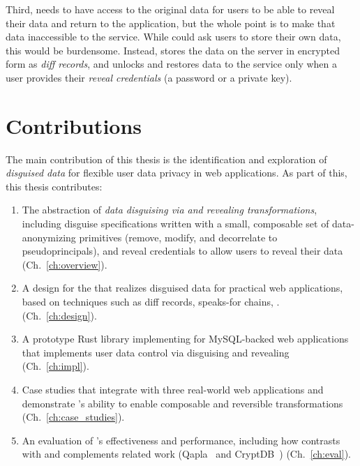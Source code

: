 %
Third, \sys needs to have access to the original data for users to be able to
reveal their data and return to the application, but the whole point is to make
that data inaccessible to the service.
%
While \sys could ask users to store their own \xxed data, this would be
burdensome.
%
Instead, \sys stores the \xxed data on the server in encrypted form as
\emph{diff records}, and unlocks
and restores data to the service only when a user provides their \emph{reveal
credentials} (\eg a password or a private key).

%
\section{Contributions}
%
The main contribution of this thesis is the identification and exploration of
\emph{disguised data} for flexible user data privacy in web applications. As
part of this, this thesis contributes:

\begin{enumerate}[nosep]
    \item The abstraction of \emph{data disguising via \xxing and revealing
        transformations}, including 
        disguise specifications written with a small, composable set of
        data-anonymizing primitives (remove, modify, and decorrelate to
        pseudoprincipals), and reveal credentials to allow users
        to reveal their data (Ch.~\ref{ch:overview}).

    \item A design for the \sys that realizes disguised data for practical web
        applications, based on techniques such as diff
        records, speaks-for chains, .
        (Ch.~\ref{ch:design}).

    \item A prototype Rust library implementing \sys for MySQL-backed web applications that
        implements user data control via disguising and revealing
        (Ch.~\ref{ch:impl}).

    \item Case studies that integrate \sys with three real-world web
    applications and demonstrate \sys's ability to enable composable and
        reversible transformations (Ch.~\ref{ch:case_studies}).

    \item An evaluation of \sys's effectiveness and performance, including how
    \sys contrasts with and complements related work (Qapla~\cite{qapla} and
        CryptDB~\cite{cryptdb}) (Ch.~\ref{ch:eval}).
\end{enumerate}
%

